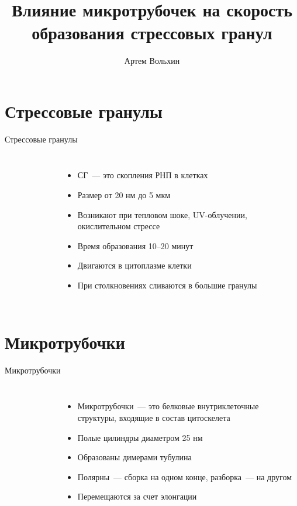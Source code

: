 \documentclass{beamer}
\title{Влияние микротрубочек на скорость образования стрессовых гранул}
\author{Артем Вольхин}
\institute{МФТИ}
\begin{document}
\begin{frame}
\titlepage
\end{frame}



\section{Стрессовые гранулы}
\begin{frame}{Стрессовые гранулы}
\begin{columns}
	\begin{figure}
	\end{figure}

	\begin{itemize}
	\item СГ~--- это скопления РНП в клетках
	\item Размер от 20 нм до 5 мкм
	\item Возникают при тепловом шоке, UV-облучении, окислительном стрессе
	\item Время образования 10--20 минут
	\item Двигаются в цитоплазме клетки
	\item При столкновениях сливаются в большие гранулы
	\end{itemize}
\end{columns}
\end{frame}

\section{Микротрубочки}
\begin{frame}{Микротрубочки}
	\begin{columns}
		\begin{figure}
		\end{figure}

		\begin{itemize}
		\item Микротрубочки~--- это белковые внутриклеточные структуры, входящие в состав цитоскелета
		\item Полые цилиндры диаметром 25 нм
		\item Образованы димерами тубулина
		\item Полярны~--- сборка на одном конце, разборка~--- на другом
		\item Перемещаются за счет элонгации
		\end{itemize}
	\end{columns}
\end{frame}
\end{document}
